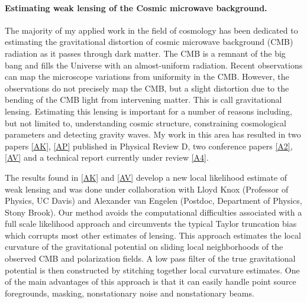 \documentclass[12pt]{article}
\begin{document}
\paragraph{Estimating weak lensing of the Cosmic microwave background.}
The majority of my applied work in the field of cosmology has been dedicated to estimating the gravitational distortion of cosmic microwave background (CMB) radiation as it passes through dark matter.  The CMB is a remnant of the big bang and fills the Universe with an almost-uniform radiation.
   Recent observations can map the microscope variations from uniformity in the CMB.
    However, the observations do not precisely map the CMB, but a slight distortion due to the bending of the CMB light from intervening matter. This is call gravitational lensing. Estimating this lensing is important for a number of reasons including, but not limited to, understanding cosmic structure, constraining cosmological parameters and detecting gravity waves.
 My work in this area has resulted in two papers \ref{AK}, \ref{AP} published in Physical Review D, two conference papers \ref{A2},\ref{AV}  and a technical report currently under review \ref{A4}.

 The results found in \ref{AK} and \ref{AV} develop a new local likelihood estimate of weak lensing and was done under collaboration with Lloyd Knox (Professor of Physics, UC Davis) and Alexander van Engelen (Postdoc, Department of Physics, Stony Brook).  Our method avoids the computational difficulties associated with a full scale likelihood approach and circumvents the typical Taylor truncation bias which corrupts most other estimates of lensing.  This approach estimates the local curvature of the gravitational potential on sliding local neighborhoods of the observed CMB and polarization fields. A low pass filter of the true gravitational potential is then constructed by stitching together local curvature estimates. One of the main advantages of this approach is that it can easily handle point source foregrounds, masking, nonstationary noise and nonstationary beams.
\end{document}

